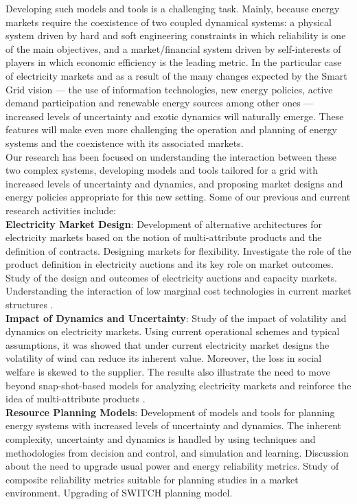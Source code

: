 Developing such models and tools is a challenging task. Mainly, because energy markets require the coexistence of two coupled dynamical systems: a physical system driven by hard and soft engineering constraints in which reliability is one of the main objectives, and a market/financial system driven by self-interests of players in which economic efficiency is the leading metric. In the particular case of electricity markets and as a result of the many changes expected by the Smart Grid vision --- the use of information technologies, new energy policies, active demand participation and renewable energy sources among other ones --- increased levels of uncertainty and exotic dynamics will naturally emerge. These features will make even more challenging the operation and planning of energy systems and the coexistence with its associated markets.\\

Our research has been focused on understanding the interaction between these two complex systems, developing models and tools tailored for a grid with increased levels of uncertainty and dynamics, and proposing market designs and energy policies appropriate for this new setting. Some of our previous and current research activities include:\\

{\bf Electricity Market Design}: Development of alternative architectures for electricity markets based on the notion of multi-attribute products and the definition of contracts. Designing markets for flexibility. Investigate the role of the product definition in electricity auctions and its key role on market outcomes. Study of the design and outcomes of electricity auctions and capacity markets. Understanding the interaction of low marginal cost technologies in current market structures \cite{neg2015,negmey12,nayneg15}. \\

{\bf Impact of Dynamics and Uncertainty}: Study of the impact of volatility and dynamics on electricity markets. Using current operational schemes and typical assumptions, it was showed that under current electricity market designs the volatility of wind can reduce its inherent value. Moreover, the loss in social welfare is skewed to the supplier. The results also illustrate the need to move beyond snap-shot-based models for analyzing electricity markets and reinforce the idea of multi-attribute products \cite{meynegwankowsha10}.\\

{\bf Resource Planning Models}: Development of models and tools for planning energy systems with increased levels of uncertainty and dynamics. The inherent complexity, uncertainty and dynamics is handled by using techniques and methodologies from decision and control, and simulation and learning. Discussion about the need to upgrade usual power and energy reliability metrics. Study of composite reliability metrics suitable for planning studies in a market environment. Upgrading of SWITCH planning model.\\

